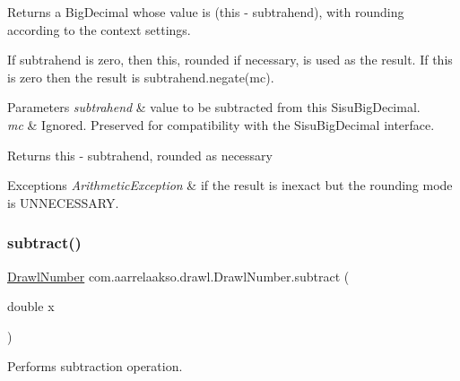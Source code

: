 Returns a Big\+Decimal whose value is (this -\/ subtrahend), with rounding according to the context settings. 

If subtrahend is zero, then this, rounded if necessary, is used as the result. If this is zero then the result is subtrahend.\+negate(mc).


\begin{DoxyParams}{Parameters}
{\em subtrahend} & value to be subtracted from this Sisu\+Big\+Decimal. \\
\hline
{\em mc} & Ignored. Preserved for compatibility with the Sisu\+Big\+Decimal interface. \\
\hline
\end{DoxyParams}
\begin{DoxyReturn}{Returns}
this -\/ subtrahend, rounded as necessary 
\end{DoxyReturn}

\begin{DoxyExceptions}{Exceptions}
{\em Arithmetic\+Exception} & if the result is inexact but the rounding mode is U\+N\+N\+E\+C\+E\+S\+S\+A\+RY. \\
\hline
\end{DoxyExceptions}
\mbox{\label{classcom_1_1aarrelaakso_1_1drawl_1_1_drawl_number_af26b18ee4dbadbad9cece6dc5e9a02ba}} 
\subsubsection{\texorpdfstring{subtract()}{subtract()}\hspace{0.1cm}{\footnotesize\ttfamily [3/3]}}
{\footnotesize\ttfamily \hyperlink{classcom_1_1aarrelaakso_1_1drawl_1_1_drawl_number}{Drawl\+Number} com.\+aarrelaakso.\+drawl.\+Drawl\+Number.\+subtract (\begin{DoxyParamCaption}\item[{double}]{x }\end{DoxyParamCaption})\hspace{0.3cm}{\ttfamily [protected]}}



Performs subtraction operation. 


